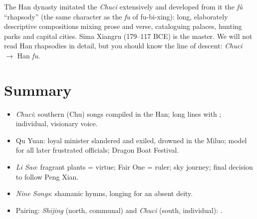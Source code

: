 The Han dynasty imitated the \emph{Chuci} extensively and developed from it the
 \emph{fù} ``rhapsody'' (the same character as the \emph{fu} of fu-bi-xing):
long, elaborately descriptive compositions mixing prose and verse, cataloguing palaces,
hunting parks and capital cities. Sima Xiangru  (179--117 BCE) is the master.
We will not read Han rhapsodies in detail, but you should know the line of descent:
\emph{Chuci} $\to$ Han \emph{fu}.

\section*{Summary}
\begin{itemize}
  \item \emph{Chuci}: southern (Chu) songs compiled in the Han; long lines with ;
        individual, visionary voice.
  \item Qu Yuan: loyal minister slandered and exiled, drowned in the Miluo; model for all
        later frustrated officials; Dragon Boat Festival.
  \item \emph{Li Sao}: fragrant plants = virtue; Fair One = ruler; sky journey; final
        decision to follow Peng Xian.
  \item \emph{Nine Songs}: shamanic hymns, longing for an absent deity.
  \item Pairing: \emph{Shijing} (north, communal) and \emph{Chuci} (south, individual):
        .
\end{itemize}

